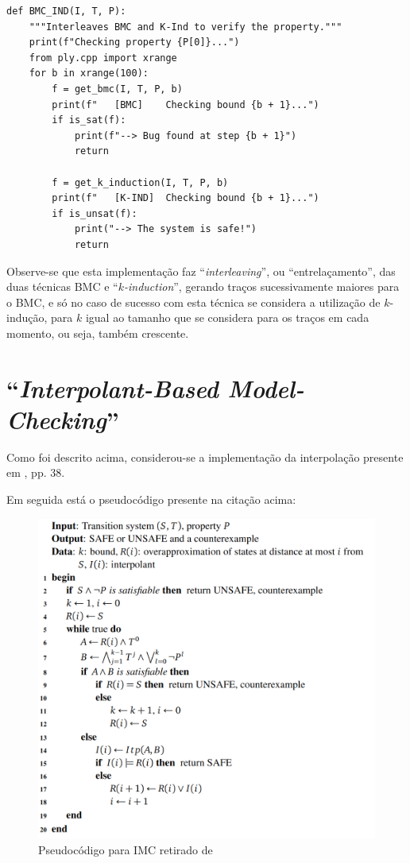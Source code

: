 \documentclass[11pt,a4paper]{report}%
\newenvironment{code}{\captionsetup{type=listing}}{}
\def\imc{``\textit{Interpolant-Based Model-Checking}''\xspace}
\def\kind{``\textit{$k$-induction}''\xspace}
\begin{document}

\begin{code}
\begin{verbatim}
def BMC_IND(I, T, P):
    """Interleaves BMC and K-Ind to verify the property."""
    print(f"Checking property {P[0]}...")
    from ply.cpp import xrange
    for b in xrange(100):
        f = get_bmc(I, T, P, b)
        print(f"   [BMC]    Checking bound {b + 1}...")
        if is_sat(f):
            print(f"--> Bug found at step {b + 1}")
            return

        f = get_k_induction(I, T, P, b)
        print(f"   [K-IND]  Checking bound {b + 1}...")
        if is_unsat(f):
            print("--> The system is safe!")
            return

\end{verbatim}
\end{code}

Observe-se que esta implementação faz ``\textit{interleaving}'', ou ``entrelaçamento'',
das duas técnicas BMC e \kind, gerando traços sucessivamente maiores para o BMC, e só
no caso de sucesso com esta técnica se considera a utilização de $k$-indução, para
$k$ igual ao tamanho que se considera para os traços em cada momento, ou seja,
também crescente.

\section{\imc}
\label{analysis:imc}

Como foi descrito acima, considerou-se a implementação da interpolação presente em
\cite{interpolation_thesis}, pp. 38.

Em seguida está o pseudocódigo presente na citação acima:

\begin{figure}[H]
      \centering
      \includegraphics[scale=0.66]{imc-pseudocode.png}
      \caption{Pseudocódigo para IMC retirado de \cite{interpolation_thesis}}
      \label{fig:imcpseudo}
\end{figure}
\end{document}

